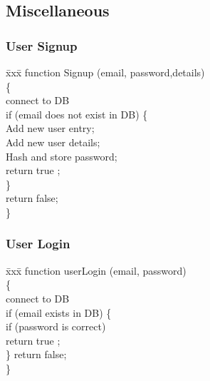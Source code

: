 \documentclass[11pt]{report}
\begin{document}
\begin{figure}[h]
\subsection{Miscellaneous}
\subsubsection{User Signup}
\begin{tabbing}
\= xxx\= \kill
function Signup (email, password,details)\\
\{\\
\hspace{0.3in}connect to DB\\
\hspace{0.3in}if (email does not exist in DB) \{\\
 \hspace{0.6in}Add new user entry;\\ 
 \hspace{0.6in}Add new user details;\\ 
 \hspace{0.6in}Hash and store password;\\ 
\hspace{0.6in}return true ;\\
\hspace{0.3in} \}\\
\hspace{0.3in}return false;\\
\}
\end{tabbing}
\subsubsection{User Login}
\begin{tabbing}
\= xxx\= \kill
function userLogin (email, password)\\
\{\\
\hspace{0.3in}connect to DB\\
\hspace{0.3in}if (email exists in DB) \{\\
 \hspace{0.6in}if (password is correct)\\ 
\hspace{1.2in}return true ;\\
\hspace{0.3in} \}
\hspace{0.3in}return false;\\
\}
\end{tabbing}

\end{figure}
\end{document}
